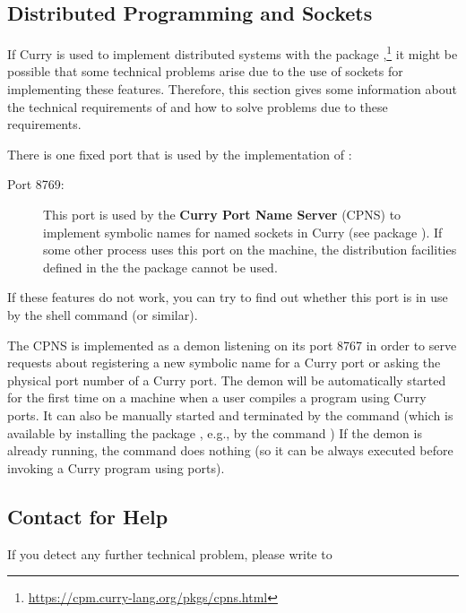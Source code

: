 \subsection{Distributed Programming and Sockets}

If Curry is used to implement distributed systems
with the package ,\footnote{%
\url{https://cpm.curry-lang.org/pkgs/cpns.html}}
it might be possible that some technical problems
arise due to the use of sockets for implementing these
features. Therefore, this section gives some information
about the technical requirements of \CYS and how to solve
problems due to these requirements.

There is one fixed port that is used by the implementation of \CYS:
\begin{description}
\item[Port 8769:] This port is used by the
{\bf Curry Port Name Server} (CPNS) to implement symbolic names for
named sockets in Curry (see package ).
If some other process uses this port on the machine,
the distribution facilities defined in the the package 
cannot be used.
\end{description}
If these features do not work, you can try to find out
whether this port is in use by the shell command
 (or similar).

The CPNS is implemented as a demon listening on its port 8767
in order to serve requests about registering a new symbolic
name for a Curry port or asking the physical port number
of a Curry port. The demon will be automatically started for
the first time on a machine when a user compiles a program
using Curry ports.
It can also be manually started and terminated by the
command  (which is available by installing
the package , e.g., by the command )
If the demon is already running,
the command 
does nothing (so it can be always executed
before invoking a Curry program using ports).

\subsection{Contact for Help}

If you detect any further technical problem,
please write to
\begin{center}
\end{center}

